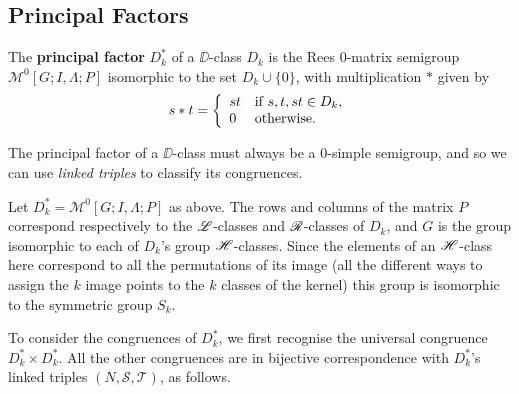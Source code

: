 \subsection{Principal Factors}
\label{sec:principal}

\begin{definition}
\label{def:principalfactor}
The \textbf{principal factor} $D_k^*$ of a $\DD$-class $D_k$ is the Rees
0-matrix semigroup $\mathcal{M}^0[G;I,\Lambda;P]$ isomorphic to the set $D_k \cup
\{0\}$, with multiplication $*$ given by
$$s * t = \left\{
  \begin{array}{l l}
    st & \text{if~} s,t,st \in D_k, \\
    0 & \text{otherwise}.
  \end{array}\right.$$
\end{definition}

The principal factor of a $\DD$-class must always be a 0-simple
semigroup, and so we can use \textit{linked triples} to classify its
congruences.\cite[3.5]{howie}

Let $D_k^* = \mathcal{M}^0[G;I,\Lambda;P]$ as above.
The rows and columns of the matrix $P$ correspond respectively to the $\mathrel{\mathscr{L}}$-classes and
$\mathrel{\mathscr{R}}$-classes of $D_k$, and $G$ is the group isomorphic to each of $D_k$'s group
$\mathrel{\mathscr{H}}$-classes.  Since the elements of an $\mathrel{\mathscr{H}}$-class here correspond to all the permutations
of its image (all the different ways to assign the $k$ image points to the $k$
classes of the kernel) this group is isomorphic to the symmetric group $S_k$.

To consider the congruences of $D_k^*$, we first recognise the universal
congruence $D_k^* \times D_k^*$.  All the other congruences are in bijective
correspondence with $D_k^*$'s linked triples $(N,\mathcal{S},\mathcal{T})$, as
follows.

